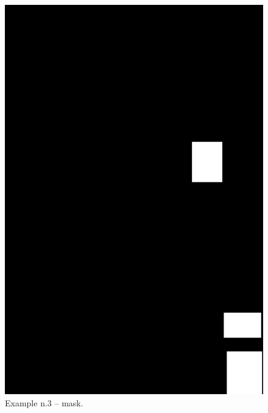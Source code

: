 \documentclass[a4paper, 11pt]{article}
\begin{document}
\begin{figure}
    \centering
    \includegraphics[width=.95\linewidth]{documentation/img/masks/0027_mask.png}
    \caption{Example n.3 -- mask.}
    \label{img:ex_n.3_mask}
\end{figure}
\end{document}
